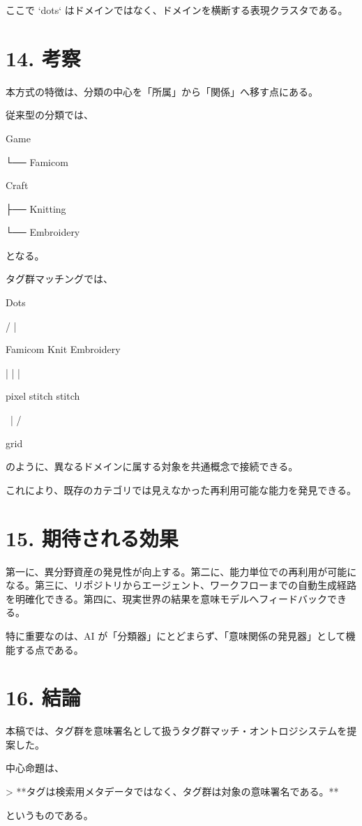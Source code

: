 \documentclass[a4paper,11pt]{jsarticle}
\begin{document}
ここで `dots` はドメインではなく、ドメインを横断する表現クラスタである。


\section{14. 考察}
本方式の特徴は、分類の中心を「所属」から「関係」へ移す点にある。


従来型の分類では、


Game


 └── Famicom


Craft


 ├── Knitting


 └── Embroidery


となる。


タグ群マッチングでは、


          Dots


        /  |  \


   Famicom Knit Embroidery


      |      |      |


    pixel  stitch  stitch


      \      |      /


          grid


のように、異なるドメインに属する対象を共通概念で接続できる。


これにより、既存のカテゴリでは見えなかった再利用可能な能力を発見できる。


\section{15. 期待される効果}
第一に、異分野資産の発見性が向上する。第二に、能力単位での再利用が可能になる。第三に、リポジトリからエージェント、ワークフローまでの自動生成経路を明確化できる。第四に、現実世界の結果を意味モデルへフィードバックできる。


特に重要なのは、AI が「分類器」にとどまらず、「意味関係の発見器」として機能する点である。


\section{16. 結論}
本稿では、タグ群を意味署名として扱うタグ群マッチ・オントロジシステムを提案した。


中心命題は、


> **タグは検索用メタデータではなく、タグ群は対象の意味署名である。**


というものである。
\end{document}
